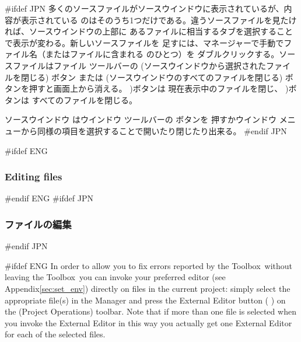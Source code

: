 \documentclass[\pformat,12pt]{article}
\newcommand{\Toolbox}{Toolbox}
\newcommand{\Toolbox}{Toolbox}
\newcommand{\guicmd}[1]{{\sf #1}}
\newcommand{\guicmd}[1]{{\gt #1}}
\begin{document}
#ifdef JPN
多くのソースファイルが\guicmd{ソースウインドウ}に表示されているが、内容が表示されている
のはそのうち1つだけである。違うソースファイルを見たければ、\guicmd{ソースウインドウ}の上部に
あるファイルに相当するタブを選択することで表示が変わる。新しいソースファイルを
足すには、\guicmd{マネージャー}で手動でファイル名（またはファイルに含まれる
 のひとつ）を
ダブルクリックする。ソースファイルは\guicmd{ファイル} ツールバーの 
(\guicmd{ソースウインドウから選択されたファイルを閉じる}) ボタン
または 
(\guicmd{ソースウインドウのすべてのファイルを閉じる}) ボタンを押すと画面上から消える。 
)ボタンは
現在表示中のファイルを閉じ、
)ボタンは
すべてのファイルを閉じる。

\guicmd{ソースウインドウ} は\guicmd{ウインドウ} ツールバーの
ボタンを
押すか\guicmd{ウインドウ} メニューから同様の項目を選択することで開いたり閉じたり出来る。
#endif JPN

#ifdef ENG
\subsubsection{Editing files}
#endif ENG
#ifdef JPN
\subsubsection{ファイルの編集}
#endif JPN

#ifdef ENG
In order to allow you to fix errors reported by the \Toolbox\ without
leaving the \Toolbox\ you can invoke your preferred editor (see
Appendix\ref{sec:set_env}) directly on files in the current project:
simply select the appropriate file(s) in the \guicmd{Manager} and
press the \guicmd{External Editor} button (%
) 
on the (\guicmd{Project Operations}) toolbar. Note that if more than
one file is selected when you invoke the \guicmd{External Editor} in
this way you actually get one \guicmd{External Editor} for each of the
selected files.
\end{document}
